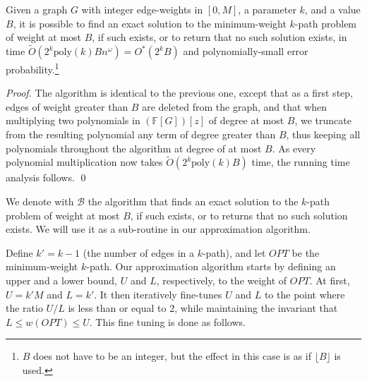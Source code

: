 \documentclass{llncs}
\newcommand{\poly}{\mathrm{poly}}
\newcommand{\FF}{\mathbb{F}}
\newcommand{\FG}{{\FF[G]}}
\begin{document}
\begin{proposition}\label{lemma:bound}
Given a graph $G$ with integer edge-weights in $[0,M]$, a parameter $k$, and a value $B$, it is possible to find an exact solution to the minimum-weight $k$-path problem of weight at most $B$, if such exists, or to return that no such solution exists, in time $\tilde{O}(2^k \poly(k) B n^\omega) = O^*(2^k B)$ and polynomially-small error probability.\footnote{$B$ does not have to be an integer, but the effect in this case is as if $\lfloor B \rfloor$ is used.}
\end{proposition}
\begin{proof}
The algorithm is identical to the previous one, except that as a first step, edges of weight greater than $B$ are deleted from the graph, and that when multiplying two polynomials in $(\FG)[z]$ of degree at most $B$, we truncate from the resulting polynomial any term of degree greater than $B$, thus keeping all polynomials throughout the algorithm at degree of at most $B$. As every polynomial multiplication now takes $\tilde{O}(2^k \poly(k) B)$ time, the running time analysis follows.
\qed\end{proof}
We denote with $\mathcal{B}$ the algorithm that finds an exact solution to the $k$-path problem of weight at most $B$, if such exists, or to returns that no such solution exists. We will use it as a sub-routine in our approximation algorithm.

Define $k'=k-1$ (the number of edges in a $k$-path), and let $OPT$ be the minimum-weight $k$-path. Our approximation algorithm starts by defining an upper and a lower bound, $U$ and $L$, respectively, to the weight of $OPT$. At first, $U=k'M$ and $L=k'$. It then iteratively fine-tunes $U$ and $L$ to the point where the ratio $U/L$ is less than or equal to $2$, while maintaining the invariant that $L \leq w(OPT) \leq U$. This fine tuning is done as follows. 
\end{document}
